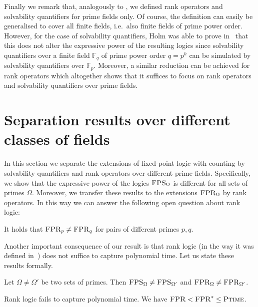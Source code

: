 \documentclass[a4paper,UKenglish]{lipics}
\newcommand{\field}[1]{\mathbb{#1}}
\newcommand{\logic}[1]{\ensuremath{\textsc{#1}}\xspace}
\newcommand{\FPRK}{\logic{FPR}}
\newcommand{\FPR}{\FPRK}
\newcommand{\FPSx}[1]{\ensuremath{\logic{FPS}_{#1}}\xspace}
\newcommand{\FPRvar}{\ensuremath{\logic{FPR}^*}\xspace}
\newcommand{\FPRx}[1]{\ensuremath{\logic{FPR}_{#1}}\xspace}
\newcommand{\compclass}[1]{\ensuremath{\textsc{#1}}\xspace}
\newcommand{\PTIME}{\compclass{Ptime}}
\theoremstyle{plain}
\begin{document}
Finally we remark that, analogously to \cite{DaGrHoLa09}, we defined rank 
operators and solvability quantifiers for prime fields only. Of course, the 
definition can easily be generalised to cover all finite fields, i.e.\ also 
finite fields of prime power order. 
However, for the case of solvability quantifiers, Holm was able to prove 
in~\cite{Ho10} that this does not alter the expressive power of the resulting 
logics since solvability quantifiers over a finite field $\field F_q$ of prime 
power order $q = p^k$ can be simulated by solvability quantifiers over $\field 
F_p$. Moreover, a similar reduction can be achieved for rank operators which 
altogether shows that it suffices to focus on rank operators and solvability 
quantifiers over prime fields.


\section{Separation results over different classes of fields}
\label{sec:sep:fields}

In this section we separate the extensions of fixed-point logic with counting 
by solvability quantifiers and rank operators over different prime fields. 
Specifically, we show that the expressive power of the logics $\FPSx{\Omega}$ 
is different for all sets of primes $\Omega$.
Moreover, we transfer these results to the extensions $\FPRx{\Omega}$ by rank 
operators. In this way we can answer the following open question about rank 
logic:
\begin{center}
 It holds that $\FPRx{p} \neq \FPRx{q}$ for pairs of different primes $p,q$. 
\cite{DaHo12, Ho10, La11}
\end{center}

Another important consequence of our result is that rank logic (in the way it 
was defined in~\cite{DaGrHoLa09}) does not suffice to capture 
polynomial time. 
Let us state these results formally.

\begin{theorem}\label{thm:fpr:mainthm}
 Let $\Omega \neq \Omega'$ be two sets of primes.
Then $\FPSx{\Omega} \neq \FPSx{\Omega'}$ and $\FPRx{\Omega} \neq 
\FPRx{\Omega'}$.
\end{theorem}

\begin{theorem} \label{thm:ranklogic:ptime}
Rank logic fails to capture polynomial time. We have $\FPR < \FPRvar \leq 
\PTIME$.
\end{theorem}
\end{document}
